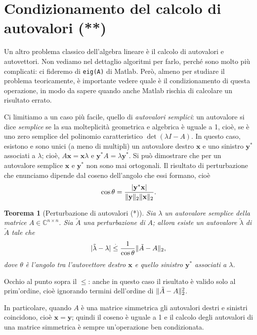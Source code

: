 \documentclass[a4paper]{report}
\DeclarePairedDelimiter{\abs}{\lvert}{\rvert}
\DeclarePairedDelimiter{\norm}{\lVert}{\rVert}
\newtheorem{theorem}{Teorema}[chapter]
\theoremstyle{definition}
\theoremstyle{remark}
\begin{document}
\section{Condizionamento del calcolo di autovalori (**)}
Un altro problema classico dell'algebra lineare è il calcolo di autovalori e autovettori. Non vediamo nel dettaglio algoritmi per farlo, perché sono molto più complicati: ci fideremo di \texttt{eig(A)} di Matlab. Però, almeno per studiare il problema teoricamente, è importante vedere quale è il condizionamento di questa operazione, in modo da sapere quando anche Matlab rischia di calcolare un risultato errato.

Ci limitiamo a un caso più facile, quello di \emph{autovalori semplici}: un autovalore si dice \emph{semplice} se la sua molteplicità geometrica e algebrica è uguale a 1, cioè, se è uno zero semplice del polinomio caratteristico $\det(\lambda I - A)$. In questo caso, esistono e sono unici (a meno di multipli) un autovalore destro $\mathbf{x}$ e uno sinistro $\mathbf{y}^*$ associati a $\lambda$; cioè, $A\mathbf{x} = \mathbf{x}\lambda$ e $\mathbf{y}^* A = \lambda \mathbf{y}^*$. Si può dimostrare che per un autovalore semplice $\mathbf{x}$ e $\mathbf{y}^*$ non sono mai ortogonali. Il risultato di perturbazione che enunciamo dipende dal coseno dell'angolo che essi formano, cioè
\[
\cos \theta = \frac{\abs{\mathbf{y}^* \mathbf{x}}}{\norm{\mathbf{y}}_2 \norm{\mathbf{x}}_2}.
\]
\begin{theorem}[Perturbazione di autovalori (*)]
Sia $\lambda$ un autovalore \emph{semplice} della matrice $A \in \mathbb{C}^{n\times n}$. Sia $\tilde{A}$ una perturbazione di $A$; allora esiste un autovalore $\tilde{\lambda}$ di $\tilde{A}$ tale che
\[
\abs{\tilde{\lambda} - \lambda} \stackrel{.}{\leq} \frac{1}{\cos \theta}\norm{\tilde{A}-A}_2,
\]
dove $\theta$ è l'angolo tra l'autovettore destro $\mathbf{x}$ e quello sinistro $\mathbf{y}^*$ associati a $\lambda$.
\end{theorem}
Occhio al punto sopra il $\leq$: anche in questo caso il risultato è valido solo al prim'ordine, cioè ignorando termini dell'ordine di $\norm{\tilde{A}-A}_2^2$.

In particolare, quando $A$ è una matrice simmetrica gli autovalori destri e sinistri coincidono, cioè $\mathbf{x}=\mathbf{y}$; quindi il coseno è uguale a 1 e il calcolo degli autovalori di una matrice simmetrica è sempre un'operazione ben condizionata.
\end{document}
